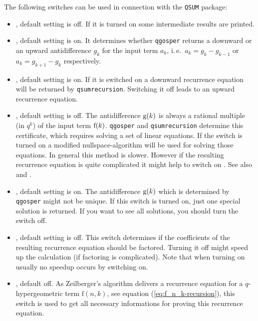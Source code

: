 The following switches can be used in connection with
the \texttt{QSUM} package:
%
\begin{itemize}
	\item {}, default setting is off. If it is
		turned on some intermediate results are printed.
	\item {}, default setting is on. It determines
		whether \texttt{qgosper} returns a downward or an upward
		antidifference $g_k$ for the input term $a_k$,
	   i.\,e.\ $a_k=g_k-g_{k-1}$ or $a_k=g_{k+1}-g_k$ respectively.
	\item {}, default setting is on. If it is
		switched on a downward recurrence equation will be returned by
		\texttt{qsumrecursion}. Switching it off leads to an upward
		recurrence equation.
	\item {}, default setting is off. The 
		antidifference ${\mathrm g}(k)$ is always a rational multiple (in $q^k$)
		of the input term ${\mathrm f}(k)$. \texttt{qgosper} and \texttt{qsumrecursion}
		determine this certificate, which requires solving a set of
		linear equations. If the switch  is
		turned on a modified nullspace-algorithm will be used for
		solving those equations. In general this method is slower.
		However if the resulting recurrence equation is quite complicated
		it might help to switch on .
		See also \cite{Knuth:TAoCP2} and \cite{PauleRiese:95}.
	\item {}, default setting is on. The
		antidifference ${\mathrm g}(k)$ which is determined by 
		\texttt{qgosper} might not be unique. If this switch is turned on,
		just one special solution is returned. If you want
		to see all solutions, you should turn the switch off.
	\item {}, default setting is off. This
		switch determines if the coefficients of the
		resulting recurrence equation should
		be factored. Turning it off might speed up the calculation
		(if factoring is complicated). Note that
		when turning on  usually no speedup
		occurs by switching  on.
	\item {}, default off. 
		As Zeilberger's algorithm 
		delivers a recurrence equation for a $q$-hypergeometric term
		$\mathrm{f}(n,k)$, see equation (\ref{eq:f_n_k-recursion}),
		this switch is used to get all necessary informations for
		proving this recurrence equation.


\end{itemize}

